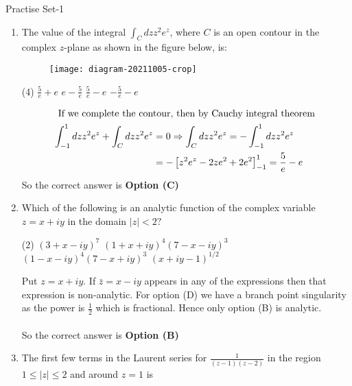 \newpage
\begin{abox}
	Practise Set-1
	\end{abox}
\begin{enumerate}[label=\color{ocre}\textbf{\arabic*.}]
	\item The value of the integral $\int_{C} d z z^{2} e^{z}$, where $C$ is an open contour in the complex $z$-plane as shown in the figure below, is:
	{}
	\begin{figure}[H]
		\centering
		\texttt{[image: diagram-20211005-crop]}
	\end{figure}
	\begin{tasks}(4)
		\task[\textbf{A.}] $\frac{5}{e}+e$
		\task[\textbf{B.}] $e-\frac{5}{e}$
		\task[\textbf{C.}] $\frac{5}{e}-e$
		\task[\textbf{D.}] $-\frac{5}{e}-e$
	\end{tasks}
	\begin{answer}
		\begin{align*}
		\intertext { If we complete the contour, then by Cauchy integral theorem }
		\int_{-1}^{1} d z z^{2} e^{z}+\int_{C} d z z^{2} e^{z}&=0 \Rightarrow \int_{C} d z z^{2} e^{z}=-\int_{-1}^{1} d z z^{2} e^{z}\\&=-\left[z^{2} e^{z}-2 z e^{2}+2 e^{2}\right]_{-1}^{1}=\frac{5}{e}-e
		\end{align*}
		So the correct answer is \textbf{Option (C)}
	\end{answer}
	\item Which of the following is an analytic function of the complex variable $z=x+i y$ in the domain $|z|<2 ?$
	{}
	\begin{tasks}(2)
		\task[\textbf{A.}] $(3+x-i y)^{7}$
		\task[\textbf{B.}] $(1+x+i y)^{4}(7-x-i y)^{3}$
		\task[\textbf{C.}] $(1-x-i y)^{4}(7-x+i y)^{3}$
		\task[\textbf{D.}] $(x+i y-1)^{1 / 2}$
	\end{tasks}
	\begin{answer}
		Put $z=x+i y .$ If $\bar{z}=x-i y$ appears in any of the expressions then that expression is non-analytic. For option (D) we have a branch point singularity as the power is $\frac{1}{2}$ which is fractional. Hence only option (B) is analytic.\\\\
		So the correct answer is \textbf{Option (B)}
	\end{answer}
	\item The first few terms in the Laurent series for $\frac{1}{(z-1)(z-2)}$ in the region $1 \leq|z| \leq 2$ and around $z=1$ is

\end{enumerate}
